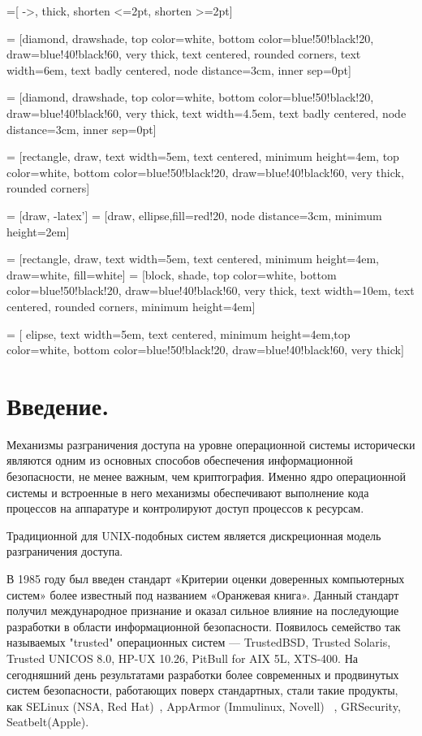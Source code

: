 =[ ->,
	thick,
	shorten <=2pt,
	shorten >=2pt]

 = [diamond, drawshade, top color=white,
    bottom color=blue!50!black!20, draw=blue!40!black!60, very
    thick, text centered, rounded corners, text width=6em, text badly centered, node distance=3cm, inner sep=0pt]

  = [diamond, drawshade,  top color=white,
    bottom color=blue!50!black!20, draw=blue!40!black!60, very
    thick, text width=4.5em, text badly centered, node distance=3cm, inner sep=0pt]

  = [rectangle, draw,  text width=5em, text centered, minimum height=4em, top color=white,  bottom color=blue!50!black!20, draw=blue!40!black!60, very thick, rounded corners]

 = [draw, -latex']
 = [draw, ellipse,fill=red!20, node distance=3cm,
    minimum height=2em]
   
 = [rectangle, draw,  text width=5em, text centered, minimum height=4em, draw=white, fill=white]
 = [block, shade, top color=white,
    bottom color=blue!50!black!20, draw=blue!40!black!60, very
    thick, text width=10em, text centered, rounded corners, minimum height=4em]

 = [ elipse, text width=5em, text centered, minimum height=4em,top color=white,
    bottom color=blue!50!black!20, draw=blue!40!black!60, very thick]

\bigskip 
\section{Введение.}

Механизмы разграничения доступа на уровне операционной
системы исторически являются одним из основных способов
обеспечения информационной безопасности, не менее
важным, чем криптография. Именно ядро операционной системы
и встроенные в него механизмы обеспечивают выполнение
кода процессов на аппаратуре и контролируют доступ
процессов к ресурсам.

Традиционной для UNIX-подобных систем является дискреционная
модель разграничения доступа. 

В 1985 году был введен стандарт «Критерии 
оценки доверенных компьютерных систем» более известный 
под названием «Оранжевая книга». Данный стандарт получил 
международное признание и оказал сильное влияние на 
последующие разработки в области информационной безопасности. 
Появилось семейство так называемых "trusted" операционных 
систем — TrustedBSD, Trusted Solaris, Trusted UNICOS 8.0, 
HP-UX 10.26, PitBull for AIX 5L, XTS-400. На сегодняшний 
день результатами разработки 
более современных и продвинутых систем безопасности, 
работающих поверх стандартных, стали такие продукты, как 
SELinux (NSA, Red Hat)~\cite{SEOF}, AppArmor (Immulinux, Novell) 
~\cite{AppArmor},
GRSecurity\cite{pax}, Seatbelt(Apple).

